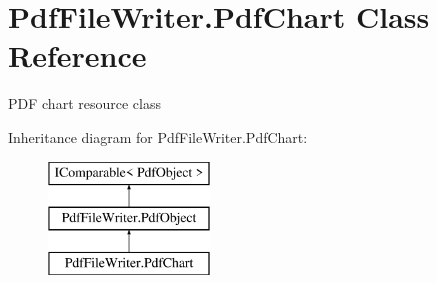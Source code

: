 \hypertarget{class_pdf_file_writer_1_1_pdf_chart}{}\section{Pdf\+File\+Writer.\+Pdf\+Chart Class Reference}
\label{class_pdf_file_writer_1_1_pdf_chart}


P\+DF chart resource class  


Inheritance diagram for Pdf\+File\+Writer.\+Pdf\+Chart\+:\begin{figure}[H]
\begin{center}
\leavevmode
\includegraphics[height=3.000000cm]{class_pdf_file_writer_1_1_pdf_chart}
\end{center}
\end{figure}
